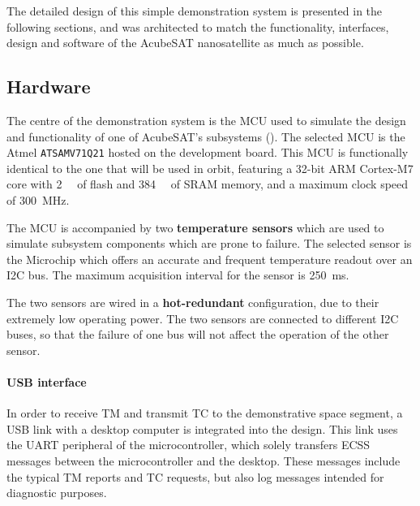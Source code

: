 \documentclass[a4paper,nobib]{tufte-book}
\begin{document}
The detailed design of this simple demonstration system is presented in the following sections, and was architected to match the functionality, interfaces, design and software of the AcubeSAT nanosatellite as much as possible.

\subsection{Hardware}

The centre of the demonstration system is the \ac{MCU} used to simulate the design and functionality of one of AcubeSAT's subsystems (). The selected \ac{MCU} is the Atmel \texttt{ATSAMV71Q21} hosted on the  development board. This \ac{MCU} is functionally identical to the one that will be used in orbit, featuring a 32-bit ARM Cortex-M7 core with \SI{2}{\mebi\byte} of flash and \SI{384}{\kibi\byte} of \acs{SRAM} memory, and a maximum clock speed of \SI{300}{\mega\hertz}.

The \ac{MCU} is accompanied by two \textbf{temperature sensors} which are used to simulate subsystem components which are prone to failure. The selected sensor is the Microchip  which offers an accurate and frequent temperature readout over an \ac{I2C} bus. The maximum acquisition interval for the sensor is \SI{250}{\milli\second}.


The two sensors are wired in a \textbf{hot-redundant} configuration, due to their extremely low operating power. The two sensors are connected to different \ac{I2C} buses, so that the failure of one bus will not affect the operation of the other sensor.

\paragraph{\acs{USB} interface} In order to receive \acl{TM} and transmit \acl{TC} to the demonstrative space segment, a \acs{USB} link with a desktop computer is integrated into the design. This link uses the \acs{UART} peripheral of the microcontroller, which solely transfers \acs{ECSS} messages between the microcontroller and the desktop. These messages include the typical \acs{TM} reports and \acs{TC} requests, but also log messages intended for diagnostic purposes.
\end{document}
